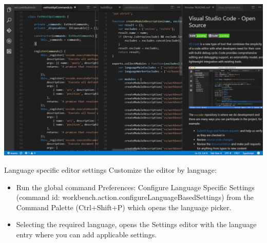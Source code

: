 \documentclass[xcolor=x11names,compress]{beamer}
\renewcommand{\(}{\begin{columns}}
\renewcommand{\)}{\end{columns}}
\newcommand{\<}[1]{\begin{column}{#1}}
\renewcommand{\>}{\end{column}}
\begin{document}
\begin{frame}
	\includegraphics[width = \textwidth, height = \textheight]{s2.png}
\end{frame}
\begin{frame}{Language specific editor settings}
	Customize the editor by language:
	\begin{itemize}
		\item Run the global command Preferences: Configure Language Specific Settings (command id: workbench.action.configureLanguageBasedSettings) from the Command Palette (Ctrl+Shift+P) which opens the language picker. 
		\item Selecting the required language, opens the Settings editor with the language entry where you can add applicable settings.
	\end{itemize}
\end{frame}

\end{document}
